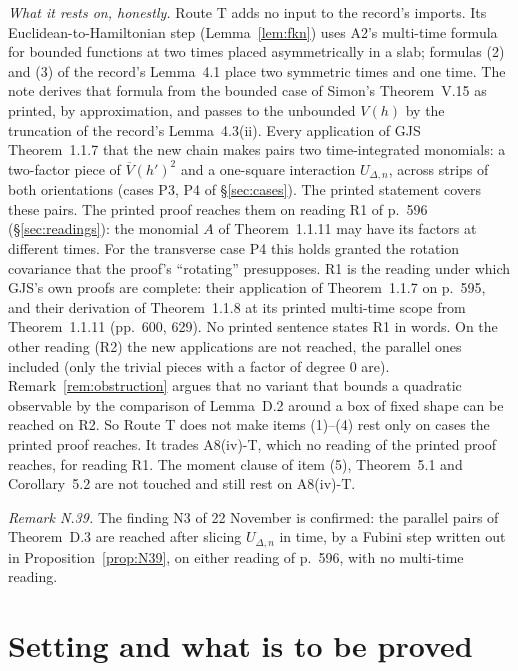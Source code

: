 \documentclass[11pt,a4paper]{article}
\newcommand{\Vb}{\overline V}                 %
\theoremstyle{plain}
\theoremstyle{definition}
\begin{document}
\emph{What it rests on, honestly.}  Route T adds no input to the record's imports.  Its
Euclidean-to-Hamiltonian step (Lemma~\ref{lem:fkn}) uses A2's multi-time formula for bounded
functions at two times placed asymmetrically in a slab; formulas (2) and (3) of the record's
Lemma~4.1 place two symmetric times and one time.  The note derives that formula from the
bounded case of Simon's Theorem~V.15 as printed, by approximation, and passes to the unbounded
$V(h)$ by the truncation of the record's Lemma~4.3(ii).  Every
application of GJS Theorem~1.1.7 that the new chain makes pairs two time-integrated monomials:
a two-factor piece of $\Vb(h')^2$ and a one-square interaction $U_{\Delta,n}$, across strips of
both orientations (cases P3, P4 of \S\ref{sec:cases}).  The printed statement covers these
pairs.  The printed proof reaches them on reading R1 of p.~596 (\S\ref{sec:readings}): the
monomial $A$ of Theorem~1.1.11 may have its factors at different times.  For the transverse
case P4 this holds granted the rotation covariance that the proof's ``rotating'' presupposes.
R1 is the reading under which GJS's own proofs are complete: their application of
Theorem~1.1.7 on p.~595, and their derivation of Theorem~1.1.8 at its printed multi-time scope
from Theorem~1.1.11 (pp.~600, 629).  No printed sentence states R1 in words.  On the other
reading (R2) the new applications are not reached, the parallel ones included (only the trivial
pieces with a factor of degree $0$ are).  Remark~\ref{rem:obstruction} argues that no variant
that bounds a quadratic observable by the comparison of Lemma~D.2 around a box of fixed shape
can be reached on R2.  So Route T does not make items (1)--(4) rest only on cases the printed
proof reaches.  It trades A8(iv)-T, which no reading of the printed proof reaches, for
reading R1.  The moment clause of item (5), Theorem~5.1 and Corollary~5.2 are not touched and
still rest on A8(iv)-T.

\emph{Remark N.39.}  The finding N3 of 22 November is confirmed: the parallel pairs of
Theorem~D.3 are reached after slicing $U_{\Delta,n}$ in time, by a Fubini step written out in
Proposition~\ref{prop:N39}, on either reading of p.~596, with no multi-time reading.

\tableofcontents

\section{Setting and what is to be proved}\label{sec:setting}
\end{document}
